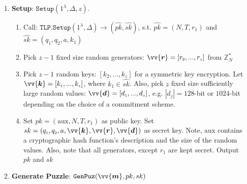 







\begin{enumerate}[leftmargin=.4cm]

\item\textbf{Setup}: $\mathtt{Setup}(1^{\scriptscriptstyle\lambda}, \Delta,z)$.  
\begin{enumerate}

\item\label{call-RTLP-Setup} Call:  $\mathtt{TLP.Setup}(1^{\scriptscriptstyle\lambda}, \Delta)\rightarrow (\hat{pk},\hat{sk})$, s.t.  $\hat{pk}=(N,T,r_{\scriptscriptstyle 1})$ and $\hat{sk}=(q_{\scriptscriptstyle 1},q_{\scriptscriptstyle 2},a,k_{\scriptscriptstyle 1})$

\item Pick  $z-1$ fixed size  random generators: $\vv{\bm{r}}=[r_{\scriptscriptstyle 2},...,r_{\scriptscriptstyle z}]$ from $\mathbb{Z}^{\scriptscriptstyle *}_{ \scriptscriptstyle N}$


\item Pick  $z-1$ random keys: $[k_{\scriptscriptstyle 2},...,k_{\scriptscriptstyle z}]$ for a symmetric key encryption. Let $\vv{\bm{k}}=[k_{\scriptscriptstyle 1},...,k_{\scriptscriptstyle z}]$, where $k_{\scriptscriptstyle 1}\in \hat{sk}$. Also, pick $z$ fixed size sufficiently large random values: $\vv{\bm{d}}=[d_{\scriptscriptstyle 1},...,d_{\scriptscriptstyle z}]$, e.g. $|d_{\scriptscriptstyle j}|=128$-bit or $1024$-bit depending on the choice of a commitment scheme.  

\item Set $pk=( \text{aux},N,T, r_{\scriptscriptstyle 1})$ as  public key. Set $sk=(q_{\scriptscriptstyle 1},q_{\scriptscriptstyle 2},a, \vv{\bm{k}},\vv{\bm{r}},\vv{\bm{d}})$ as secret key. Note, $\text{aux}$ contains a cryptographic hash function's description and the size of the random values. Also,  note that  all generators, except $r_{\scriptscriptstyle 1}$ are kept secret. Output $pk$ and $sk$

\end{enumerate}
\item\label{Generate-Puzzle}\textbf{Generate Puzzle}: $\mathtt{GenPuz}(\vv{\bm{m}}, pk,sk)$ 



\end{enumerate}
